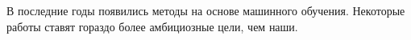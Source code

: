 
В последние годы появились методы на основе машинного обучения. Некоторые работы ставят гораздо более амбициозные цели, чем наши.


